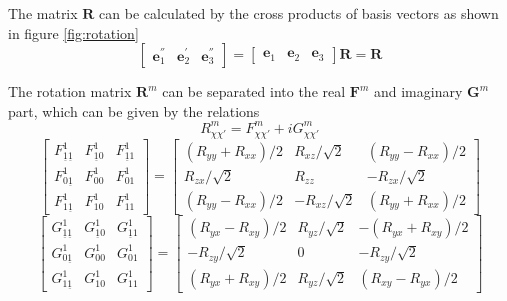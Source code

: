 The matrix $\mathbf{R}$ can be calculated by the cross products of
basis vectors as shown in figure \ref{fig:rotation}
\begin{equation}
\left[\begin{array}{ccc}
\mathbf{e}_{1}^{''} & \mathbf{e}_{2}^{'} & \mathbf{e}_{3}^{''}\end{array}\right]=\left[\begin{array}{ccc}
\mathbf{e}_{1} & \mathbf{e}_{2} & \mathbf{e}_{3}\end{array}\right]\mathbf{R}=\mathbf{R}
\end{equation}


The rotation matrix $\mathbf{R}^{m}$ can be separated into the real
$\mathbf{F}^{m}$ and imaginary $\mathbf{G}^{m}$ part, which can
be given by the relations
\begin{equation}
R_{\chi\chi'}^{m}=F_{\chi\chi'}^{m}+iG_{\chi\chi'}^{m}
\end{equation}
\begin{equation}
\left[\begin{array}{ccc}
F_{\underline{1}\underline{1}}^{1} & F_{\underline{1}0}^{1} & F_{\underline{1}1}^{1}\\
F_{0\underline{1}}^{1} & F_{00}^{1} & F_{01}^{1}\\
F_{1\underline{1}}^{1} & F_{10}^{1} & F_{11}^{1}
\end{array}\right]=\left[\begin{array}{ccc}
\left(R_{yy}+R_{xx}\right)/2 & R_{xz}/\sqrt{2} & \left(R_{yy}-R_{xx}\right)/2\\
R_{zx}/\sqrt{2} & R_{zz} & -R_{zx}/\sqrt{2}\\
\left(R_{yy}-R_{xx}\right)/2 & -R_{xz}/\sqrt{2} & \left(R_{yy}+R_{xx}\right)/2
\end{array}\right]
\end{equation}
\begin{equation}
\left[\begin{array}{ccc}
G_{\underline{1}\underline{1}}^{1} & G_{\underline{1}0}^{1} & G_{\underline{1}1}^{1}\\
G_{0\underline{1}}^{1} & G_{00}^{1} & G_{01}^{1}\\
G_{1\underline{1}}^{1} & G_{10}^{1} & G_{11}^{1}
\end{array}\right]=\left[\begin{array}{ccc}
\left(R_{yx}-R_{xy}\right)/2 & R_{yz}/\sqrt{2} & -\left(R_{yx}+R_{xy}\right)/2\\
-R_{zy}/\sqrt{2} & 0 & -R_{zy}/\sqrt{2}\\
\left(R_{yx}+R_{xy}\right)/2 & R_{yz}/\sqrt{2} & \left(R_{xy}-R_{yx}\right)/2
\end{array}\right]
\end{equation}



